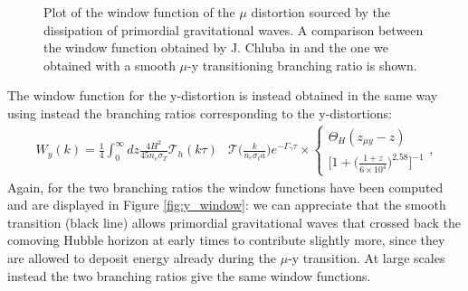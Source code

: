 \begin{figure}
    \centering
{}
\caption{Plot of the window function of the $\mu$ distortion sourced by the dissipation of primordial gravitational waves. A comparison between the window function obtained by J. Chluba in \cite{Chluba_tens_diss} and the one we obtained with a smooth $\mu$-y transitioning branching ratio is shown.}
\label{fig:mu_window}
\end{figure}

The window function for the y-distortion is instead obtained in the same way using instead the branching ratios corresponding to the y-distortions:
\begin{align*}
    W_y(k)=\frac14\int_{0}^\infty dz\frac{4H^2}{45 n_e\sigma_T}\mathcal T_h(k\tau)&\mathcal T\Big(\tfrac{k}{n_e\sigma_ta}\Big)e^{-\Gamma_\gamma\tau}\times
    \begin{cases}
        \Theta_H(z_{\mu y}-z)\\
        \bigg[1+\big(\frac{1+z}{6\times10^{4}}\big)^{2.58}\bigg]^{-1}
    \end{cases},
\end{align*}
Again, for the two branching ratios the window functions have been computed and are displayed in Figure \ref{fig:y_window}: we can appreciate that the smooth transition (black line) allows primordial gravitational waves that crossed back the comoving Hubble horizon at early times to contribute slightly more, since they are allowed to deposit energy already during the $\mu$-y transition. At large scales instead the two branching ratios give the same window functions.  

